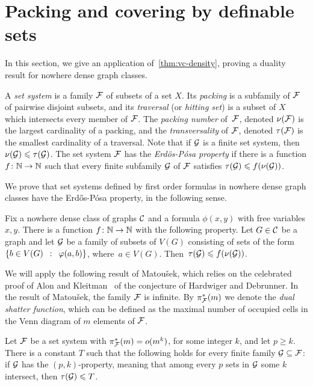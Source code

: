 \section{Packing and covering by definable sets}
In this section, we give an application 
of~\cref{thm:vc-density}, proving a 
duality result for nowhere dense graph classes.

A \emph{set system} is a family  $\cal F$ of subsets of a set $X$.
Its  \emph{packing} is a subfamily of $\cal F$ of pairwise disjoint subsets, and its \emph{traversal} (or \emph{hitting set}) is a subset of $X$ which intersects every member of $\cal F$.
The \emph{packing number} of~$\cal F$, denoted $\nu(\cal F)$ is the largest cardinality of a packing,
and the \emph{transversality} of $\cal F$, denoted
$\tau(\cal F)$ is the smallest cardinality of a traversal.
Note that if $\cal G$ is a finite set system, then
$\nu({\cal G})\le \tau(\cal G)$. 
The set system $\cal F$ has the \emph{Erd{\"o}s-Pósa property} if there is a function $f\from\N\to\N$ such that every finite subfamily $\cal G$ of $\cal F$
satisfies $\tau({\cal G})\le f(\nu(\cal G))$. 

We prove that set systems defined by first order formulas in nowhere dense graph classes have the Erd{\H o}s-P{\'o}sa property, in the following sense.

\begin{theorem}\label{thm:erdos-posa}
	Fix a nowhere dense class of graphs $\CCC$ and a 
	formula $\phi(x,y)$ with free variables $x,y$.
	There is a function $f\from \N\to\N$ with the following property.
	Let $G\in \CCC$ be a graph and let $\cal G$
	be a family of subsets of $V(G)$ consisting of sets of the form $\setof{b\in V(G)}{\phi(a, b)}$, where~$a\in V(G)$.
Then~$\tau({\cal G})\le f(\nu(\cal G))$.
\end{theorem}



We will apply the following result of Matou{\v s}ek,
which relies on the celebrated proof of Alon and Kleitman~\cite{alon-kleitman} of the conjecture of Hardwiger and Debrunner. 
In the result of Matou{\v s}ek, the family $\cal F$ is infinite. By $\pi_{\cal F}^*(m)$ we denote the \emph{dual shatter function}, which can be defined as the maximal number 
of occupied cells in the Venn diagram of $m$ elements of $\cal F$.


\begin{theorem}\label{thm:pq}
	Let $\cal F$ be a set system with $\pi^*_{\cal F}(m)=o(m^k)$,
	for some integer $k$, and let $p\ge k$.
	There is a constant $T$ such that the following holds for every finite family $\cal G\subset \cal F$: 
	if $\cal G$ has the $(p,k)$-property, meaning that 
	among every $p$ sets in $\cal G$ some $k$ intersect, then $\tau ({\cal G})\le T$.
\end{theorem}

